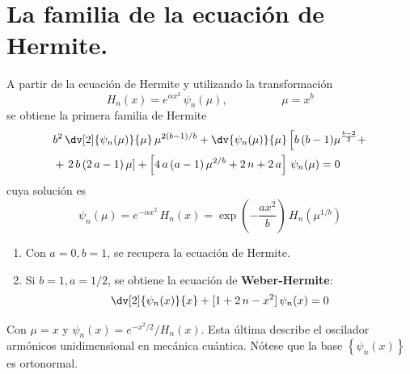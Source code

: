 \section{La familia de la ecuación de Hermite.}
A partir de la ecuación de Hermite y utilizando la transformación
\[ H_{n} (x) = e^{\alpha x^{2}} \, \psi_{n} (\mu), \hspace{2cm} \mu = x^{b} \]
se obtiene la primera familia de Hermite
\begin{align*}
&{} b^{2} \, \dv[2]{\psi_{n} (\mu)}{\mu} \, \mu^{2 (b-1)/b} + \dv{\psi_{n}(\mu)}{\mu} \left[ b \, (b-1) \mu^{\frac{b-2}{2}}  + \right. \\
&+\left. 2 \, b \, (2 \, a - 1) \, \mu \right] + \left[ 4 \, a \, (a - 1) \, \mu^{2/b} + 2 \, n + 2 \, a \right] \, \psi_{n} (\mu) = 0
\end{align*}
cuya solución es
\[ \psi_{n} (\mu) = e^{-\alpha x^{2}} \, H_{n} (x) = \exp \left( - \dfrac{a x^{2}}{b} \right) \, H_{n} (\mu^{1/b}) \]
\begin{enumerate}[label=\roman*.)]
\item Con $a = 0, b = 1$, se recupera la ecuación de Hermite.
\item Si $b = 1, a = 1/2$, se obtiene la ecuación de \textbf{Weber-Hermite}:
\begin{equation}
\dv[2]{\psi_{n} (x)}{x} + [ 1 + 2 \, n - x^{2} ] \, \psi_{n} (x) = 0
\label{eq:ecuacion_08_65}
\end{equation}
\end{enumerate}
Con $\mu = x$ y $\psi_{n} (x) = e^{-x^{2}/2} / H_{n} (x)$. Esta última describe el oscilador armónicos unidimensional en mecánica cuántica. Nótese que la base $\left\{ \psi_{n} (x) \right\}$ es ortonormal.
